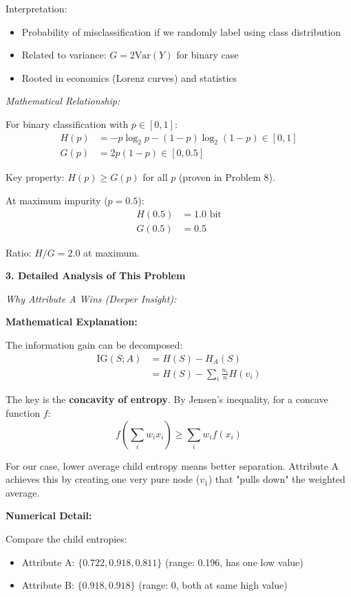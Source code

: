 \documentclass[12pt]{article}
\begin{document}
\begin{explanation}
Interpretation:
\begin{itemize}
    \item Probability of misclassification if we randomly label using class distribution
    \item Related to variance: $G = 2\text{Var}(Y)$ for binary case
    \item Rooted in economics (Lorenz curves) and statistics
\end{itemize}

\textit{Mathematical Relationship:}

For binary classification with $p \in [0, 1]$:
\begin{align*}
H(p) &= -p \log_2 p - (1-p) \log_2(1-p) \in [0, 1] \\
G(p) &= 2p(1-p) \in [0, 0.5]
\end{align*}

Key property: $H(p) \geq G(p)$ for all $p$ (proven in Problem 8).

At maximum impurity ($p = 0.5$):
\begin{align*}
H(0.5) &= 1.0 \text{ bit} \\
G(0.5) &= 0.5
\end{align*}

Ratio: $H/G = 2.0$ at maximum.

\textbf{3. Detailed Analysis of This Problem}

\textit{Why Attribute A Wins (Deeper Insight):}

\textbf{Mathematical Explanation:}

The information gain can be decomposed:
\begin{align*}
\text{IG}(S; A) &= H(S) - H_A(S) \\
&= H(S) - \sum_i \frac{n_i}{n} H(v_i)
\end{align*}

The key is the \textbf{concavity of entropy}. By Jensen's inequality, for a concave function $f$:
\[
f\left(\sum_i w_i x_i\right) \geq \sum_i w_i f(x_i)
\]

For our case, lower average child entropy means better separation. Attribute A achieves this by creating one very pure node ($v_1$) that "pulls down" the weighted average.

\textbf{Numerical Detail:}

Compare the child entropies:
\begin{itemize}
    \item Attribute A: $\{0.722, 0.918, 0.811\}$ (range: 0.196, has one low value)
    \item Attribute B: $\{0.918, 0.918\}$ (range: 0, both at same high value)
\end{itemize}


\end{explanation}
\end{document}
